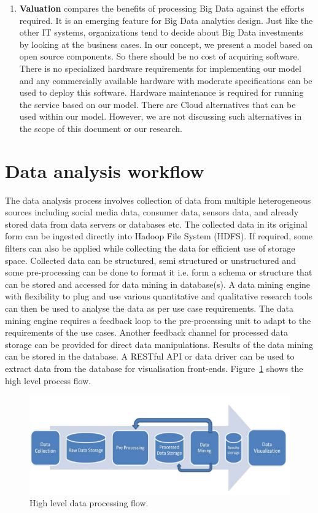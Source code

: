 \begin{enumerate}
\item \textbf{Valuation} compares the benefits of processing Big Data against the efforts required. It is an emerging feature for Big Data analytics design. Just like the other IT systems, organizations tend to decide about Big Data investments by looking at the business cases. In our concept, we present a model based on open source components. So there should be no cost of acquiring software. There is no specialized hardware requirements for implementing our model and any commercially available hardware with moderate specifications can be used to deploy this software. Hardware maintenance is required for running the service based on our model. There are Cloud alternatives that can be used within our model. However, we are not discussing such alternatives in the scope of this document or our research.    
\end{enumerate} 
\section{Data analysis workflow} \label{workflow}
 The data analysis process involves collection of data from multiple heterogeneous sources including social media data, consumer data, sensors data, and already stored data from data servers or databases etc. The collected data in its original form can be ingested directly into Hadoop File System (HDFS). If required, some filters can also be applied while collecting the data for efficient use of storage space. Collected data can be structured, semi structured or unstructured and some pre-processing can be done to format it i.e. form a schema or structure that can be stored and accessed for data mining in database(s). A data mining engine with flexibility to plug and use various quantitative and qualitative research tools can then be used to analyse the data as per use case requirements. The data mining engine requires a feedback loop to the pre-processing unit to adapt to the requirements of the use cases. Another feedback channel for processed data storage can be provided for direct data manipulations. Results of the data mining can be stored in the database. A RESTful API or data driver can be used to extract data from the database for visualisation front-ends. Figure~\ref{fig:process} shows the high level process flow.
 \begin{figure}[!h]
   \begin{center}
     \includegraphics[width=\textwidth]{images/process.pdf}
     \caption{High level data processing flow.}
     \label{fig:process}
   \end{center}
 \end{figure} 
